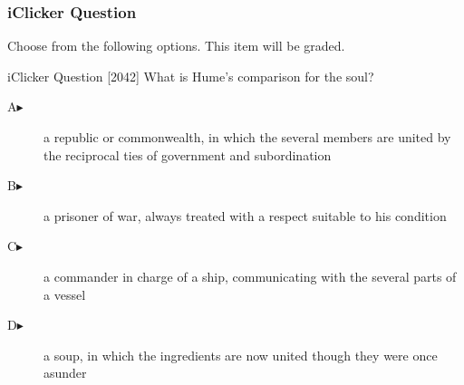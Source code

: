\begin{frame}
  \frametitle{iClicker Question}
Choose from the following options. This item will be graded.
\begin{block}{iClicker Question}
[2042] What is Hume's comparison for the soul?
\end{block}
\begin{description}
\item[A\hspace{.2in}$\blacktriangleright$] a republic or commonwealth, in which the several members are united by the reciprocal ties of government and subordination
\item[B\hspace{.2in}$\blacktriangleright$] a prisoner of war, always treated with a respect suitable to his condition
\item[C\hspace{.2in}$\blacktriangleright$] a commander in charge of a ship, communicating with the several parts of a vessel
\item[D\hspace{.2in}$\blacktriangleright$] a soup, in which the ingredients are now united though they were once asunder
\end{description}
\end{frame}
